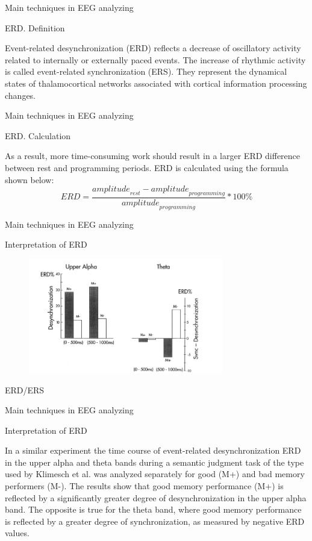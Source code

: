 \documentclass{beamer}
\begin{document}

\begin{frame}
{\centerline{Main techniques in EEG analyzing}}
{\centerline{ERD. Definition}}
Event-related desynchronization (ERD) reflects a decrease of oscillatory activity related to internally or externally paced events. The increase of rhythmic activity is called event-related synchronization (ERS). They represent the dynamical states of thalamocortical networks associated with cortical information processing changes.
\end{frame}


\begin{frame}
{\centerline{Main techniques in EEG analyzing}}
{\centerline{ERD. Calculation}}
As a result, more time-consuming work should result in a larger ERD difference between rest and programming periods. ERD is calculated using the formula shown below:
\begin{equation}
    ERD=\frac{{amplitude}_{rest}-{amplitude}_{programming}}{{amplitude}_{programming}}*100\%
\end{equation}
\end{frame}


\begin{frame}
{\centerline{Main techniques in EEG analyzing}}
{\centerline{Interpretation of ERD}}

\begin{figure}
    \centering
    \includegraphics[height=5cm]{P2023.AIBCCSS.BrainSignals/ERD ERS.png}
\end{figure}
    \begin{center}
        ERD/ERS
    \end{center}
\end{frame}

\begin{frame}
{\centerline{Main techniques in EEG analyzing}}
{\centerline{Interpretation of ERD}}
    In a similar experiment the time course of event-related desynchronization ERD in the upper alpha and theta bands during a semantic judgment task of the type used by Klimesch et al. was analyzed separately for good (M+) and bad memory performers (M-). The results show that good memory performance (M+) is reflected by a significantly greater degree of desynchronization in the upper alpha band. The opposite is true for the theta band, where good memory performance is reflected by a greater degree of synchronization, as measured by negative ERD values.
\end{frame}
\end{document}
